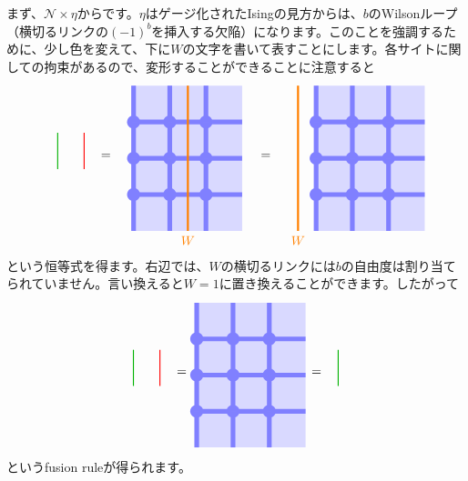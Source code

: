 \documentclass[report,paper=a4, fontsize=12pt, line_length=16cm, number_of_lines=33,dvipdfmx]{jlreq}
\numberwithin{equation}{chapter}
\newcommand{\Ncal}{\mathcal{N}}
\newcommand{\etaline}{
  \quad \tikz[baseline=0.3cm]{
    \draw[thick,red](0,1)--(0,0);
   }\quad   
}
\newcommand{\KWline}{
  \quad \tikz[baseline=0.3cm]{
    \draw[thick,darkgreen](0,1)--(0,0);
   }\quad 
}
\begin{document}
まず、$\Ncal \times \eta$からです。$\eta$はゲージ化されたIsingの見方からは、$b$のWilsonループ（横切るリンクの$(-1)^b$を挿入する欠陥）になります。このことを強調するために、少し色を変えて、下に$W$の文字を書いて表すことにします。各サイトに関しての拘束があるので、変形することができることに注意すると
\begin{align}
  \KWline \etaline =\quad
  \begin{tikzpicture}[baseline=0cm]
    \foreach \x in {0,1,2}{
        \foreach \y in {-2,-1,...,1}{
        \fill[plaqblue](\x,\y) rectangle (\x+1,\y+1);
        }
    }
    \foreach \x in {0,1,2}{
        \foreach \y in {-1,0,1}{
            \fill[linkblue] (\x,\y) circle (1.8mm);
        }
    }
    \foreach \x in {0,1,2}{
        \foreach \y in {-1,0,1}{
            \draw[linkblue, line width = 1.3mm](\x,\y)--(\x + 1,\y);
        }
    }
    \foreach \x in {0,1,2}{
        \foreach \y in {-2,-1,...,1}{
            \draw[linkblue, line width = 1.3mm](\x,\y)--(\x,\y + 1);
        }
    }
    \draw[red!50!yellow, ultra thick](1.5,2)--(1.5,-2) node[below]{$W$};
\end{tikzpicture}
\quad=\quad
\begin{tikzpicture}[baseline=0cm]
    \foreach \x in {0,1,2}{
        \foreach \y in {-2,-1,...,1}{
        \fill[plaqblue](\x,\y) rectangle (\x+1,\y+1);
        }
    }
    \foreach \x in {0,1,2}{
        \foreach \y in {-1,0,1}{
            \fill[linkblue] (\x,\y) circle (1.8mm);
        }
    }
    \foreach \x in {0,1,2}{
        \foreach \y in {-1,0,1}{
            \draw[linkblue, line width = 1.3mm](\x,\y)--(\x + 1,\y);
        }
    }
    \foreach \x in {0,1,2}{
        \foreach \y in {-2,-1,...,1}{
            \draw[linkblue, line width = 1.3mm](\x,\y)--(\x,\y + 1);
        }
    }
    \draw[red!50!yellow, ultra thick](-0.5,2)--(-0.5,-2) node[below]{$W$};
\end{tikzpicture}
\end{align}
という恒等式を得ます。右辺では、$W$の横切るリンクには$b$の自由度は割り当てられていません。言い換えると$W=1$に置き換えることができます。したがって
\begin{align}
  \KWline \etaline =
  \begin{tikzpicture}[baseline=0cm]
    \foreach \x in {0,1,2}{
        \foreach \y in {-2,-1,...,1}{
        \fill[plaqblue](\x,\y) rectangle (\x+1,\y+1);
        }
    }
    \foreach \x in {0,1,2}{
        \foreach \y in {-1,0,1}{
            \fill[linkblue] (\x,\y) circle (1.8mm);
        }
    }
    \foreach \x in {0,1,2}{
        \foreach \y in {-1,0,1}{
            \draw[linkblue, line width = 1.3mm](\x,\y)--(\x + 1,\y);
        }
    }
    \foreach \x in {0,1,2}{
        \foreach \y in {-2,-1,...,1}{
            \draw[linkblue, line width = 1.3mm](\x,\y)--(\x,\y + 1);
        }
    }
\end{tikzpicture}
=\KWline
\end{align}
というfusion ruleが得られます。
\end{document}
